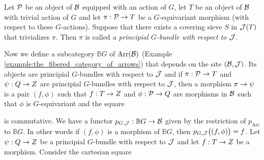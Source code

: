 \begin{definition}
Let ${\mathcal P}$ be an object of ${\mathcal B}$ equipped with an action of $G$, let $T$ be an object of ${\mathcal B}$ with trivial action of $G$ and let $\pi:{\mathcal P} \rightarrow T$ be a $G$-equivariant morphism (with respect to these $G$-actions). Suppose that there exists a covering sieve $S$ in ${\mathcal J}(T)$ that trivializes $\pi$. Then $\pi$ is called \textit{ a principial $G$-bundle with respect to ${\mathcal J}$}.
\end{definition}
\noindent
Now we define a subcategory $\mathbb{B}G$ of $\mathrm{Arr}({\mathcal B})$ (Example \ref{example:the_fibered_category_of_arrows}) that depends on the site $({\mathcal B},{\mathcal J})$. Its objects are principial $G$-bundles with respect to ${\mathcal J}$ and if $\pi:{\mathcal P}\rightarrow T$ and $\psi:Q \rightarrow Z$ are principial $G$-bundles with respect to ${\mathcal J}$, then a morphism $\pi\rightarrow \psi$ is a pair $(f,\phi)$ such that $f:T\rightarrow Z$ and $\phi:{\mathcal P}\rightarrow Q$ are morphisms in ${\mathcal B}$ such that $\phi$ is $G$-equivariant and the square
\begin{center}
\end{center}
is commutative. We have a functor $p_{G,{\mathcal J}}:\mathbb{B}G\rightarrow {\mathcal B}$ given by the restriction of $p_{\mathrm{Arr}}$ to $\mathbb{B}G$. In other words if $(f,\phi)$ is a morphism of $\mathbb{B}G$, then $p_{G,{\mathcal J}}\big((f,\phi)\big) = f$. Let $\psi:Q\rightarrow Z$ be a principial $G$-bundle with respect to ${\mathcal J}$ and let $f:T\rightarrow Z$ be a morphism. Consider the cartesian square
\begin{center}
\end{center}
